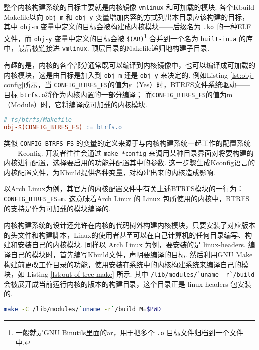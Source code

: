整个内核构建系统的目标主要就是内核镜像 \lstinline{vmlinux} 和可加载的模块.
各个Kbuild Makefile以向 \lstinline{obj-m} 和 \lstinline{obj-y} 变量增加内容的方式列出本目录应该构建的目标，
其中 \lstinline{obj-m} 变量中定义的目标会被构建成内核模块——后缀名为 \lstinline{.ko} 的一种ELF文件，而 \lstinline{obj-y} 变量中定义的目标会被 \lstinline{$(AR)}\footnote{一般就是GNU Binutils里面的ar，用于把多个 \lstinline{.o} 目标文件归档到一个文件中.} 合并到一个名为 \lstinline{built-in.a} 的库中，最后被链接进 \lstinline{vmlinux}.
顶层目录的Makefile递归地构建子目录.

有趣的是，内核的各个部分通常既可以编译到内核镜像中，也可以编译成可加载的内核模块，这是由目标是加入到 \lstinline{obj-m} 还是 \lstinline{obj-y} 来决定的.
例如Listing \ref{lst:obj-config}所示，当 \lstinline{CONFIG_BTRFS_FS}的值为y（Yes）时，BTRFS文件系统驱动——目标 \lstinline{btrfs.o}将作为内核内置的一部分编译；
而\lstinline{CONFIG_BTRFS_FS}的值为m（Module）时，它将编译成可加载的内核模块.

\begin{lstlisting}[language=make, caption=可配置的编译目标, label=lst:obj-config]
# fs/btrfs/Makefile
obj-$(CONFIG_BTRFS_FS) := btrfs.o
\end{lstlisting}

类似 \lstinline{CONFIG_BTRFS_FS} 的变量的定义来源于与内核构建系统一起工作的配置系统——Kconfig.
开发者往往会通过 \lstinline{make *config} 来调用某种目录界面对将要构建的内核进行配置，选择要启用的功能并配置其中的参数.
这一步骤生成Kconfig语言的内核配置文件，为Kbuild提供各种变量，对构建出来的内核造成影响.

以Arch Linux为例，其官方的内核配置文件中有关上述BTRFS模块的\href{https://github.com/archlinux/svntogit-packages/blob/974377e2b1ab9e822c71fbb05a82bfb8dd9a7971/trunk/config#L9619}{一行}为：
\lstinline{CONFIG_BTRFS_FS=m}.
这意味着Arch Linux 的 Linux 包所使用的内核中，BTRFS的支持是作为可加载的模块编译的.

内核构建系统的设计还允许在内核的代码树外构建内核模块，只要安装了对应版本的头文件和构建脚本，Linux的使用者甚至可以在自己计算机的任何目录编写、构建和安装自己的内核模块.
同样以 Arch Linux 为例，要安装的是
\href{https://archlinux.org/packages/core/x86_64/linux-headers/}{linux-headers}.
编译自己的模块时，首先编写Kbuild文件，声明要编译的目标.
然后利用GNU Make构建前更改工作目录的功能，使用安装在系统中的内核构建系统来编译自己的模块，如 Listing \ref{lst:out-of-tree-make} 所示.
其中 \lstinline{/lib/modules/`uname -r`/build} 会被展开成当前运行内核的版本的构建目录，这个目录正是 linux-headers 包安装的.
\begin{lstlisting}[language=sh, caption=为本机的内核构建模块, label=lst:out-of-tree-make]
make -C /lib/modules/`uname -r`/build M=$PWD
\end{lstlisting}

